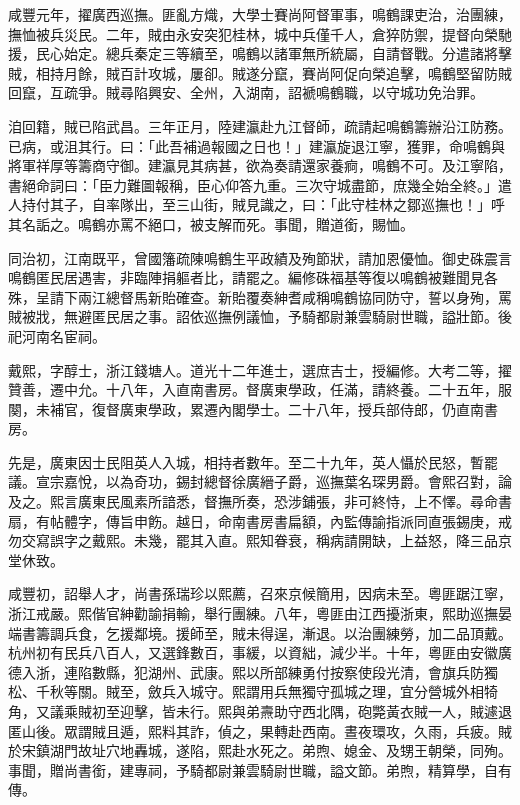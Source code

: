 \begin{pinyinscope}
咸豐元年，擢廣西巡撫。匪亂方熾，大學士賽尚阿督軍事，鳴鶴課吏治，治團練，撫恤被兵災民。二年，賊由永安突犯桂林，城中兵僅千人，倉猝防禦，提督向榮馳援，民心始定。總兵秦定三等續至，鳴鶴以諸軍無所統屬，自請督戰。分遣諸將擊賊，相持月餘，賊百計攻城，屢卻。賊遂分竄，賽尚阿促向榮追擊，鳴鶴堅留防賊回竄，互疏爭。賊尋陷興安、全州，入湖南，詔褫鳴鶴職，以守城功免治罪。

洎回籍，賊已陷武昌。三年正月，陸建瀛赴九江督師，疏請起鳴鶴籌辦沿江防務。已病，或沮其行。曰：「此吾補過報國之日也！」建瀛旋退江寧，獲罪，命鳴鶴與將軍祥厚等籌商守御。建瀛見其病甚，欲為奏請還家養痾，鳴鶴不可。及江寧陷，書絕命詞曰：「臣力難圖報稱，臣心仰答九重。三次守城盡節，庶幾全始全終。」遣人持付其子，自率隊出，至三山街，賊見識之，曰：「此守桂林之鄒巡撫也！」呼其名詬之。鳴鶴亦罵不絕口，被支解而死。事聞，贈道銜，賜恤。

同治初，江南既平，曾國籓疏陳鳴鶴生平政績及殉節狀，請加恩優恤。御史硃震言鳴鶴匿民居遇害，非臨陣捐軀者比，請罷之。編修硃福基等復以鳴鶴被難聞見各殊，呈請下兩江總督馬新貽確查。新貽覆奏紳耆咸稱鳴鶴協同防守，誓以身殉，罵賊被戕，無避匿民居之事。詔依巡撫例議恤，予騎都尉兼雲騎尉世職，謚壯節。後祀河南名宦祠。

戴熙，字醇士，浙江錢塘人。道光十二年進士，選庶吉士，授編修。大考二等，擢贊善，遷中允。十八年，入直南書房。督廣東學政，任滿，請終養。二十五年，服闋，未補官，復督廣東學政，累遷內閣學士。二十八年，授兵部侍郎，仍直南書房。

先是，廣東因士民阻英人入城，相持者數年。至二十九年，英人懾於民怒，暫罷議。宣宗嘉悅，以為奇功，錫封總督徐廣縉子爵，巡撫葉名琛男爵。會熙召對，論及之。熙言廣東民風素所諳悉，督撫所奏，恐涉鋪張，非可終恃，上不懌。尋命書扇，有帖體字，傳旨申飭。越日，命南書房書扁額，內監傳諭指派同直張錫庚，戒勿交寫誤字之戴熙。未幾，罷其入直。熙知眷衰，稱病請開缺，上益怒，降三品京堂休致。

咸豐初，詔舉人才，尚書孫瑞珍以熙薦，召來京候簡用，因病未至。粵匪踞江寧，浙江戒嚴。熙偕官紳勸諭捐輸，舉行團練。八年，粵匪由江西擾浙東，熙助巡撫晏端書籌調兵食，乞援鄰境。援師至，賊未得逞，漸退。以治團練勞，加二品頂戴。杭州初有民兵八百人，又選鋒數百，事緩，以資絀，減少半。十年，粵匪由安徽廣德入浙，連陷數縣，犯湖州、武康。熙以所部練勇付按察使段光清，會旗兵防獨松、千秋等關。賊至，斂兵入城守。熙謂用兵無獨守孤城之理，宜分營城外相犄角，又議乘賊初至迎擊，皆未行。熙與弟燾助守西北隅，砲斃黃衣賊一人，賊遽退匿山後。眾謂賊且遁，熙料其詐，偵之，果轉赴西南。晝夜環攻，久雨，兵疲。賊於宋鎮湖門故址穴地轟城，遂陷，熙赴水死之。弟煦、媳金、及甥王朝榮，同殉。事聞，贈尚書銜，建專祠，予騎都尉兼雲騎尉世職，謚文節。弟煦，精算學，自有傳。


\end{pinyinscope}
